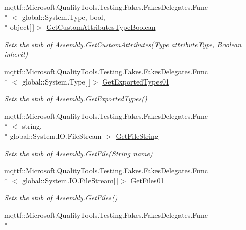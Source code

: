 \begin{DoxyCompactItemize}
mqttf\-::\-Microsoft.\-Quality\-Tools.\-Testing.\-Fakes.\-Fakes\-Delegates.\-Func\\*
$<$ global\-::\-System.\-Type, bool, \\*
object\mbox{[}$\,$\mbox{]}$>$ \hyperlink{class_system_1_1_reflection_1_1_fakes_1_1_stub_assembly_a565030f6da1d2d27e9047e3261306e4d}{Get\-Custom\-Attributes\-Type\-Boolean}
\begin{DoxyCompactList}\small\item\em Sets the stub of Assembly.\-Get\-Custom\-Attributes(\-Type attribute\-Type, Boolean inherit)\end{DoxyCompactList}\item 
mqttf\-::\-Microsoft.\-Quality\-Tools.\-Testing.\-Fakes.\-Fakes\-Delegates.\-Func\\*
$<$ global\-::\-System.\-Type\mbox{[}$\,$\mbox{]}$>$ \hyperlink{class_system_1_1_reflection_1_1_fakes_1_1_stub_assembly_ae2ed47b15789b7f401d00e26cd6fc147}{Get\-Exported\-Types01}
\begin{DoxyCompactList}\small\item\em Sets the stub of Assembly.\-Get\-Exported\-Types()\end{DoxyCompactList}\item 
mqttf\-::\-Microsoft.\-Quality\-Tools.\-Testing.\-Fakes.\-Fakes\-Delegates.\-Func\\*
$<$ string, \\*
global\-::\-System.\-I\-O.\-File\-Stream $>$ \hyperlink{class_system_1_1_reflection_1_1_fakes_1_1_stub_assembly_a6463dc811725af16cc17d32328c13ae9}{Get\-File\-String}
\begin{DoxyCompactList}\small\item\em Sets the stub of Assembly.\-Get\-File(\-String name)\end{DoxyCompactList}\item 
mqttf\-::\-Microsoft.\-Quality\-Tools.\-Testing.\-Fakes.\-Fakes\-Delegates.\-Func\\*
$<$ global\-::\-System.\-I\-O.\-File\-Stream\mbox{[}$\,$\mbox{]}$>$ \hyperlink{class_system_1_1_reflection_1_1_fakes_1_1_stub_assembly_a19a470b0eb8b5277c959b0e7ef711085}{Get\-Files01}
\begin{DoxyCompactList}\small\item\em Sets the stub of Assembly.\-Get\-Files()\end{DoxyCompactList}\item 
mqttf\-::\-Microsoft.\-Quality\-Tools.\-Testing.\-Fakes.\-Fakes\-Delegates.\-Func\\*

\end{DoxyCompactItemize}
